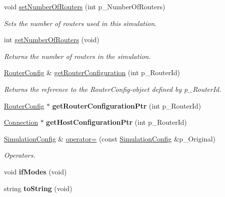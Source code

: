 \begin{DoxyCompactItemize}
\item 
void \hyperlink{classSimulationConfig_aa7665120bc7e38768ec483e5c1daada7}{set\-Number\-Of\-Routers} (int p\-\_\-\-Number\-Of\-Routers)
\begin{DoxyCompactList}\small\item\em Sets the number of routers used in this simulation. \end{DoxyCompactList}\item 
int \hyperlink{classSimulationConfig_a5523c4c41cdd0b094dc3d84e0c310058}{get\-Number\-Of\-Routers} (void)
\begin{DoxyCompactList}\small\item\em Returns the number of routers in the simulation. \end{DoxyCompactList}\item 
\hyperlink{classRouterConfig}{Router\-Config} \& \hyperlink{classSimulationConfig_a66aa890c0bdae066484b14adc6e056e7}{get\-Router\-Configuration} (int p\-\_\-\-Router\-Id)
\begin{DoxyCompactList}\small\item\em Returns the reference to the Router\-Config-\/object defined by p\-\_\-\-Router\-Id. \end{DoxyCompactList}\item 
\hypertarget{classSimulationConfig_a753beeec5358a2fb222588801d31b24e}{\hyperlink{classRouterConfig}{Router\-Config} $\ast$ {\bfseries get\-Router\-Configuration\-Ptr} (int p\-\_\-\-Router\-Id)}\label{classSimulationConfig_a753beeec5358a2fb222588801d31b24e}

\item 
\hypertarget{classSimulationConfig_a6e8ea0a98f3e04be129501eb2a024310}{\hyperlink{classConnection}{Connection} $\ast$ {\bfseries get\-Host\-Configuration\-Ptr} (int p\-\_\-\-Router\-Id)}\label{classSimulationConfig_a6e8ea0a98f3e04be129501eb2a024310}

\item 
\hypertarget{classSimulationConfig_a824111112a0ddc0cd9bfc532cce663fc}{\hyperlink{classSimulationConfig}{Simulation\-Config} \& \hyperlink{classSimulationConfig_a824111112a0ddc0cd9bfc532cce663fc}{operator=} (const \hyperlink{classSimulationConfig}{Simulation\-Config} \&p\-\_\-\-Original)}\label{classSimulationConfig_a824111112a0ddc0cd9bfc532cce663fc}

\begin{DoxyCompactList}\small\item\em Operators. \end{DoxyCompactList}\item 
\hypertarget{classSimulationConfig_adbc183975c7dfca169c53647e276998c}{void {\bfseries if\-Modes} (void)}\label{classSimulationConfig_adbc183975c7dfca169c53647e276998c}

\item 
\hypertarget{classSimulationConfig_aa4c6f7793fc34671aa0a1a277d187525}{string {\bfseries to\-String} (void)}\label{classSimulationConfig_aa4c6f7793fc34671aa0a1a277d187525}

\end{DoxyCompactItemize}
